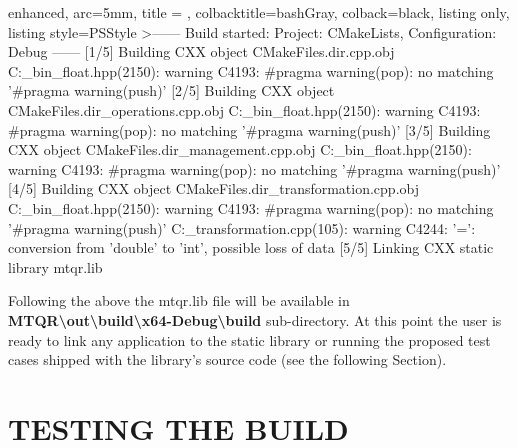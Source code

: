 \documentclass[a4paper, twosided]{book}
\begin{document}
\vspace{0.2cm}
\begin{tcblisting}{enhanced,
                   arc=5mm,
                   title = \color{black}{\large \ttfamily Compiling the static library target},
                   colbacktitle=bashGray,
                   colback=black,
                   listing only,
                   listing style=PSStyle}
>------ Build started: Project: CMakeLists, Configuration: Debug ------
  [1/5] Building CXX object CMakeFiles\mtqr.dir\src\mtqr.cpp.obj
C:\boost\boost\multiprecision\cpp_bin_float.hpp(2150): warning C4193: #pragma warning(pop): no matching '#pragma warning(push)'
  [2/5] Building CXX object CMakeFiles\mtqr.dir\src\vector_operations.cpp.obj
C:\boost\boost\multiprecision\cpp_bin_float.hpp(2150): warning C4193: #pragma warning(pop): no matching '#pragma warning(push)'
  [3/5] Building CXX object CMakeFiles\mtqr.dir\src\data_management.cpp.obj
C:\boost\boost\multiprecision\cpp_bin_float.hpp(2150): warning C4193: #pragma warning(pop): no matching '#pragma warning(push)'
  [4/5] Building CXX object CMakeFiles\mtqr.dir\src\monomial_transformation.cpp.obj
C:\boost\boost\multiprecision\cpp_bin_float.hpp(2150): warning C4193: #pragma warning(pop): no matching '#pragma warning(push)'
C:\MTQR\src\monomial_transformation.cpp(105): warning C4244: '=': conversion from 'double' to 'int', possible loss of data
  [5/5] Linking CXX static library mtqr.lib
\end{tcblisting}
\vspace{0.3cm}

\noindent
Following the above the \colorbox{poliGrayBlue}{mtqr.lib} file will be available in \colorbox{poliGrayBlue}{\textbf{MTQR\textbackslash out\textbackslash build\textbackslash x64-Debug\textbackslash build}} sub-directory. At this point the user is ready to link any application to the static library or running the proposed test cases shipped with the library's source code (see the following Section).

\section[Testing the build]{\changefont TESTING THE BUILD}\label{Sec2.4}
\end{document}
